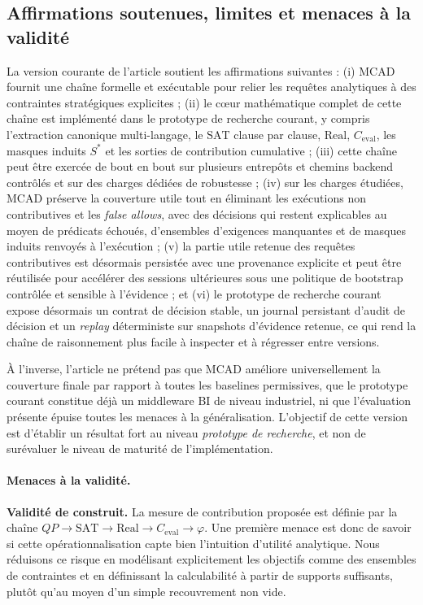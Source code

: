 \documentclass[journal]{IEEEtran}
\begin{document}
\subsection{Affirmations soutenues, limites et menaces à la validité}

La version courante de l'article soutient les affirmations suivantes : (i) MCAD fournit une chaîne formelle et exécutable pour relier les requêtes analytiques à des contraintes stratégiques explicites ; (ii) le cœur mathématique complet de cette chaîne est implémenté dans le prototype de recherche courant, y compris l'extraction canonique multi-langage, le $\mathrm{SAT}$ clause par clause, $\mathrm{Real}$, $C_{\mathrm{eval}}$, les masques induits $S^*$ et les sorties de contribution cumulative ; (iii) cette chaîne peut être exercée de bout en bout sur plusieurs entrepôts et chemins backend contrôlés et sur des charges dédiées de robustesse ; (iv) sur les charges étudiées, MCAD préserve la couverture utile tout en éliminant les exécutions non contributives et les \emph{false allows}, avec des décisions qui restent explicables au moyen de prédicats échoués, d'ensembles d'exigences manquantes et de masques induits renvoyés à l'exécution ; (v) la partie utile retenue des requêtes contributives est désormais persistée avec une provenance explicite et peut être réutilisée pour accélérer des sessions ultérieures sous une politique de bootstrap contrôlée et sensible à l'évidence ; et (vi) le prototype de recherche courant expose désormais un contrat de décision stable, un journal persistant d'audit de décision et un \emph{replay} déterministe sur snapshots d'évidence retenue, ce qui rend la chaîne de raisonnement plus facile à inspecter et à régresser entre versions.

À l'inverse, l'article ne prétend pas que MCAD améliore universellement la couverture finale par rapport à toutes les baselines permissives, que le prototype courant constitue déjà un middleware BI de niveau industriel, ni que l'évaluation présente épuise toutes les menaces à la généralisation. L'objectif de cette version est d'établir un résultat fort au niveau \emph{prototype de recherche}, et non de surévaluer le niveau de maturité de l'implémentation.

\paragraph*{Menaces à la validité.}

\textbf{Validité de construit.} La mesure de contribution proposée est définie par la chaîne $QP \rightarrow \mathrm{SAT} \rightarrow \mathrm{Real} \rightarrow C_{\mathrm{eval}} \rightarrow \varphi$. Une première menace est donc de savoir si cette opérationnalisation capte bien l'intuition d'utilité analytique. Nous réduisons ce risque en modélisant explicitement les objectifs comme des ensembles de contraintes et en définissant la calculabilité à partir de supports suffisants, plutôt qu'au moyen d'un simple recouvrement non vide.
\end{document}
